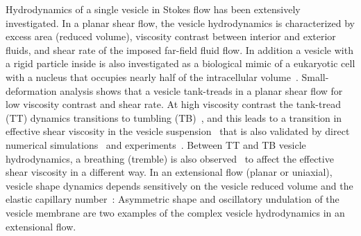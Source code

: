 \documentclass[prf,superscriptaddress,showpacs]{revtex4-1}
\begin{document}
Hydrodynamics of a single vesicle in Stokes flow has been extensively
investigated. In a planar shear flow, the vesicle hydrodynamics is
characterized by excess area (reduced volume), viscosity contrast
between interior and exterior fluids, and shear rate of the imposed
far-field fluid flow. In addition a vesicle with a rigid particle inside
is also investigated as a biological mimic of a eukaryotic cell with a
nucleus that occupies nearly half of the intracellular
volume~\cite{Veerapaneni2011_PRL}. Small-deformation analysis shows that
a vesicle tank-treads in a planar shear flow for low viscosity contrast
and shear rate. At high viscosity contrast the tank-tread (TT) dynamics
transitions to tumbling (TB)~\cite{Misbah2006_PRL, Vlahovska2007_PRE},
and this leads to a transition in effective shear viscosity in the
vesicle suspension~\cite{Misbah2006_PRL,Vitkova2008_BJ} that is also
validated by direct numerical
simulations~\cite{GhigliottiBibenMisbah2010_JFM} and
experiments~\cite{KantslerSegreSteinberg2008_EPL,
ZabuskySegreDeschamps2011_PoF}.  Between TT and TB vesicle
hydrodynamics, a breathing (tremble) is also
observed~\cite{Misbah2006_PRL,KantslerSegreSteinberg2008_PRL,
ZhaoShaqfeh2011_JFM, SpannZhaoShaqfeh2014_PoF} to affect the effective
shear viscosity in a different way.  In an extensional flow (planar or
uniaxial), vesicle shape dynamics depends sensitively on the vesicle
reduced volume  and the elastic capillary
number~\cite{KantslerSegreSteinberg2008_PRL, ZhaoShaqfeh2013_JFM,
Narsimhan2014_JFM, DahlNarsimhanGouveia2016_SoftMatt}: Asymmetric shape
and oscillatory undulation of the vesicle membrane are two examples of
the complex vesicle hydrodynamics in an extensional flow.
\end{document}
